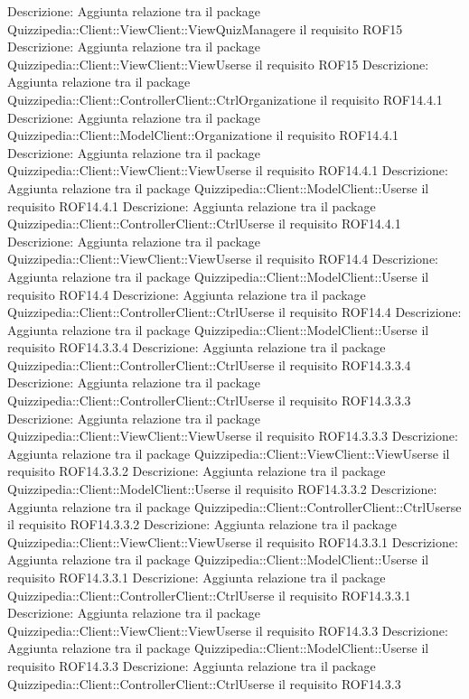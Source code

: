 Descrizione: Aggiunta relazione tra il package Quizzipedia::Client::ViewClient::ViewQuizManagere il requisito ROF15 
Descrizione: Aggiunta relazione tra il package Quizzipedia::Client::ViewClient::ViewUserse il requisito ROF15 
Descrizione: Aggiunta relazione tra il package Quizzipedia::Client::ControllerClient::CtrlOrganizatione il requisito ROF14.4.1 
Descrizione: Aggiunta relazione tra il package Quizzipedia::Client::ModelClient::Organizatione il requisito ROF14.4.1 
Descrizione: Aggiunta relazione tra il package Quizzipedia::Client::ViewClient::ViewUserse il requisito ROF14.4.1 
Descrizione: Aggiunta relazione tra il package Quizzipedia::Client::ModelClient::Userse il requisito ROF14.4.1 
Descrizione: Aggiunta relazione tra il package Quizzipedia::Client::ControllerClient::CtrlUserse il requisito ROF14.4.1 
Descrizione: Aggiunta relazione tra il package Quizzipedia::Client::ViewClient::ViewUserse il requisito ROF14.4 
Descrizione: Aggiunta relazione tra il package Quizzipedia::Client::ModelClient::Userse il requisito ROF14.4 
Descrizione: Aggiunta relazione tra il package Quizzipedia::Client::ControllerClient::CtrlUserse il requisito ROF14.4 
Descrizione: Aggiunta relazione tra il package Quizzipedia::Client::ModelClient::Userse il requisito ROF14.3.3.4 
Descrizione: Aggiunta relazione tra il package Quizzipedia::Client::ControllerClient::CtrlUserse il requisito ROF14.3.3.4 
Descrizione: Aggiunta relazione tra il package Quizzipedia::Client::ControllerClient::CtrlUserse il requisito ROF14.3.3.3 
Descrizione: Aggiunta relazione tra il package Quizzipedia::Client::ViewClient::ViewUserse il requisito ROF14.3.3.3 
Descrizione: Aggiunta relazione tra il package Quizzipedia::Client::ViewClient::ViewUserse il requisito ROF14.3.3.2 
Descrizione: Aggiunta relazione tra il package Quizzipedia::Client::ModelClient::Userse il requisito ROF14.3.3.2 
Descrizione: Aggiunta relazione tra il package Quizzipedia::Client::ControllerClient::CtrlUserse il requisito ROF14.3.3.2 
Descrizione: Aggiunta relazione tra il package Quizzipedia::Client::ViewClient::ViewUserse il requisito ROF14.3.3.1 
Descrizione: Aggiunta relazione tra il package Quizzipedia::Client::ModelClient::Userse il requisito ROF14.3.3.1 
Descrizione: Aggiunta relazione tra il package Quizzipedia::Client::ControllerClient::CtrlUserse il requisito ROF14.3.3.1 
Descrizione: Aggiunta relazione tra il package Quizzipedia::Client::ViewClient::ViewUserse il requisito ROF14.3.3 
Descrizione: Aggiunta relazione tra il package Quizzipedia::Client::ModelClient::Userse il requisito ROF14.3.3 
Descrizione: Aggiunta relazione tra il package Quizzipedia::Client::ControllerClient::CtrlUserse il requisito ROF14.3.3 

